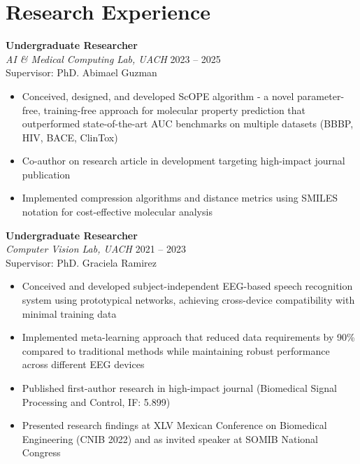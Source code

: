 \section*{Research Experience}


\textbf{Undergraduate Researcher} \\
\textit{AI \& Medical Computing Lab, UACH} \hfill {2023 -- 2025} \\
Supervisor: PhD. Abimael Guzman
\begin{itemize}
    \item Conceived, designed, and developed ScOPE algorithm - a novel parameter-free, training-free approach for molecular property prediction that outperformed state-of-the-art AUC benchmarks on multiple datasets (BBBP, HIV, BACE, ClinTox)
    \item Co-author on research article in development targeting high-impact journal publication
    \item Implemented compression algorithms and distance metrics using SMILES notation for cost-effective molecular analysis
\end{itemize}

\textbf{Undergraduate Researcher} \\
\textit{Computer Vision Lab, UACH} \hfill {2021 -- 2023} \\
Supervisor: PhD. Graciela Ramirez
\begin{itemize}
    \item Conceived and developed subject-independent EEG-based speech recognition system using prototypical networks, achieving cross-device compatibility with minimal training data
    \item Implemented meta-learning approach that reduced data requirements by 90\% compared to traditional methods while maintaining robust performance across different EEG devices
    \item Published first-author research in high-impact journal (Biomedical Signal Processing and Control, IF: 5.899)
    \item Presented research findings at XLV Mexican Conference on Biomedical Engineering (CNIB 2022) and as invited speaker at SOMIB National Congress
\end{itemize}


